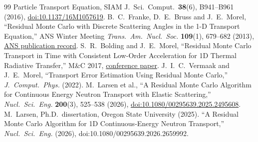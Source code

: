 \documentclass[11pt]{article}
\begin{document}
\begin{thebibliography}{99}
{  Particle Transport Equation}, SIAM J.\ Sci.\ Comput.\ \textbf{38}(6),
  B941--B961 (2016), \href{https://doi.org/10.1137/16M1057619}{doi:10.1137/16M1057619}.
 B.~C.~Franke, D.~E.~Bruss and J.~E.~Morel, ``Residual Monte Carlo with
  Discrete Scattering Angles in the 1-D Transport Equation,'' ANS Winter Meeting
  \emph{Trans.\ Am.\ Nucl.\ Soc.} \textbf{109}(1), 679--682 (2013),
  \href{https://www.ans.org/pubs/transactions/volume-109/}{ANS publication record}.
 S.~R.~Bolding and J.~E.~Morel, ``Residual Monte Carlo Transport in
  Time with Consistent Low-Order Acceleration for 1D Thermal Radiative Transfer,''
  M\&C 2017,
  \href{https://www.kns.org/files/int_paper/paper/MC2017_2017_2/P102S02-03BoldingS.pdf}
  {conference paper}.
 J.~I.~C.~Vermaak and J.~E.~Morel, ``Transport Error Estimation Using
  Residual Monte Carlo,'' \emph{J.\ Comput.\ Phys.} (2022).
 M.~Larsen et al., ``A Residual Monte Carlo Algorithm for
  Continuous Energy Neutron Transport with Elastic Scattering,'' \emph{Nucl.\ Sci.\
  Eng.} \textbf{200}(3), 525--538 (2026),
  \href{https://doi.org/10.1080/00295639.2025.2495608}{doi:10.1080/00295639.2025.2495608}.
\bibitem{larsen-diss} M.~Larsen, Ph.D.\ dissertation, Oregon State University (2025).
\bibitem{larsen-1d} ``A Residual Monte Carlo Algorithm for 1D Continuous-Energy Neutron
  Transport,'' \emph{Nucl.\ Sci.\ Eng.} (2026), doi:10.1080/00295639.2026.2659992.
\end{thebibliography}
\end{document}
